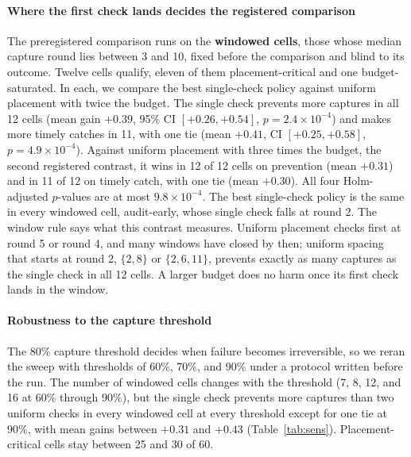 \documentclass[pdflatex,sn-mathphys-num]{sn-jnl}
\theoremstyle{thmstyleone}%
\begin{document}
\paragraph{Where the first check lands decides the registered comparison}
The preregistered comparison runs on the \textbf{windowed cells}, those whose median capture round lies between 3 and 10, fixed before the comparison and blind to its outcome. Twelve cells qualify, eleven of them placement-critical and one budget-saturated. In each, we compare the best single-check policy against uniform placement with twice the budget. The single check prevents more captures in all 12 cells (mean gain $+0.39$, 95\% CI $[+0.26, +0.54]$, $p = 2.4\times10^{-4}$) and makes more timely catches in 11, with one tie (mean $+0.41$, CI $[+0.25, +0.58]$, $p = 4.9\times10^{-4}$). Against uniform placement with three times the budget, the second registered contrast, it wins in 12 of 12 cells on prevention (mean $+0.31$) and in 11 of 12 on timely catch, with one tie (mean $+0.30$). All four Holm-adjusted $p$-values are at most $9.8\times10^{-4}$. The best single-check policy is the same in every windowed cell, audit-early, whose single check falls at round 2. The window rule says what this contrast measures. Uniform placement checks first at round 5 or round 4, and many windows have closed by then; uniform spacing that starts at round 2, $\{2, 8\}$ or $\{2, 6, 11\}$, prevents exactly as many captures as the single check in all 12 cells. A larger budget does no harm once its first check lands in the window.

\paragraph{Robustness to the capture threshold}
The 80\% capture threshold decides when failure becomes irreversible, so we reran the sweep with thresholds of 60\%, 70\%, and 90\% under a protocol written before the run. The number of windowed cells changes with the threshold (7, 8, 12, and 16 at 60\% through 90\%), but the single check prevents more captures than two uniform checks in every windowed cell at every threshold except for one tie at 90\%, with mean gains between $+0.31$ and $+0.43$ (Table~\ref{tab:sens}). Placement-critical cells stay between 25 and 30 of 60.
\end{document}
